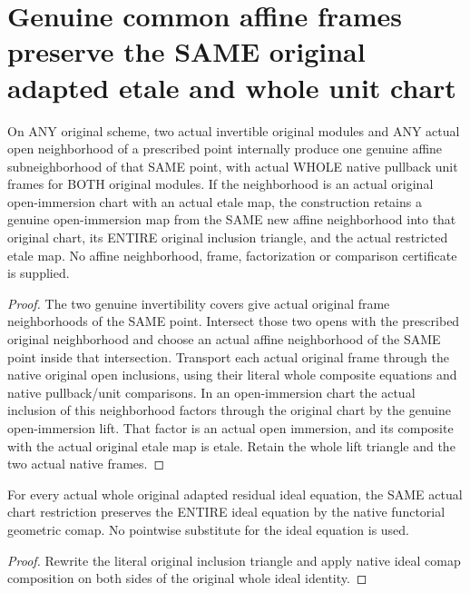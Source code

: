 \section{Genuine common affine frames preserve the SAME original adapted etale and whole unit chart}
\begin{theorem}\label{thm:actual-original-common-affine-line-frames}
\leanok
{}
On ANY original scheme, two actual invertible original modules and ANY actual open neighborhood of a prescribed point internally produce one genuine affine subneighborhood of that SAME point, with actual WHOLE native pullback unit frames for BOTH original modules. If the neighborhood is an actual original open-immersion chart with an actual etale map, the construction retains a genuine open-immersion map from the SAME new affine neighborhood into that original chart, its ENTIRE original inclusion triangle, and the actual restricted etale map. No affine neighborhood, frame, factorization or comparison certificate is supplied.
\end{theorem}
\begin{proof}
The two genuine invertibility covers give actual original frame neighborhoods of the SAME point. Intersect those two opens with the prescribed original neighborhood and choose an actual affine neighborhood of the SAME point inside that intersection. Transport each actual original frame through the native original open inclusions, using their literal whole composite equations and native pullback/unit comparisons. In an open-immersion chart the actual inclusion of this neighborhood factors through the original chart by the genuine open-immersion lift. That factor is an actual open immersion, and its composite with the actual original etale map is etale. Retain the whole lift triangle and the two actual native frames.
\end{proof}
\begin{lemma}\label{lem:actual-common-affine-residual-ideal-restriction}
\leanok
For every actual whole original adapted residual ideal equation, the SAME actual chart restriction preserves the ENTIRE ideal equation by the native functorial geometric comap. No pointwise substitute for the ideal equation is used.
\end{lemma}
\begin{proof}
Rewrite the literal original inclusion triangle and apply native ideal comap composition on both sides of the original whole ideal identity.
\end{proof}
